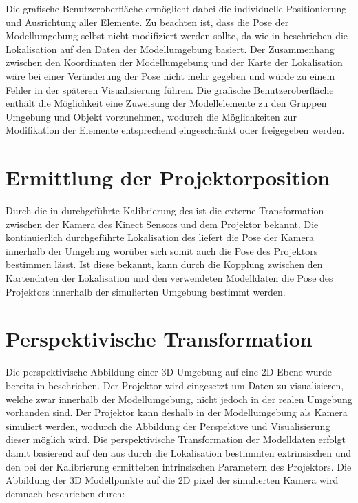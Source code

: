 Die grafische Benutzeroberfläche ermöglicht dabei die individuelle Positionierung und Ausrichtung aller Elemente. Zu beachten ist, dass die Pose der Modellumgebung selbst nicht modifiziert werden sollte, da wie in  beschrieben die Lokalisation auf den Daten der Modellumgebung basiert. Der Zusammenhang zwischen den Koordinaten der Modellumgebung und der Karte der Lokalisation wäre bei einer Veränderung der Pose nicht mehr gegeben und würde zu einem Fehler in der späteren Visualisierung führen. Die grafische Benutzeroberfläche enthält die Möglichkeit eine Zuweisung der Modellelemente zu den Gruppen Umgebung und Objekt vorzunehmen, wodurch die Möglichkeiten zur Modifikation der Elemente entsprechend eingeschränkt oder freigegeben werden.



\section{Ermittlung der Projektorposition}
Durch die in  durchgeführte Kalibrierung des  ist die externe Transformation zwischen der Kamera des Kinect Sensors und dem Projektor bekannt. Die kontinuierlich durchgeführte Lokalisation des  liefert die Pose der Kamera innerhalb der Umgebung worüber sich somit auch die Pose des Projektors bestimmen lässt. Ist diese bekannt, kann durch die Kopplung zwischen den Kartendaten der Lokalisation und den verwendeten Modelldaten die Pose des Projektors innerhalb der simulierten Umgebung bestimmt werden.

\section{Perspektivische Transformation}
Die perspektivische Abbildung einer 3D Umgebung auf eine 2D Ebene wurde bereits in  beschrieben. Der Projektor wird eingesetzt um Daten zu visualisieren, welche zwar innerhalb der Modellumgebung, nicht jedoch in der realen Umgebung vorhanden sind. Der Projektor kann deshalb in der Modellumgebung als Kamera simuliert werden, wodurch die Abbildung der Perspektive und Visualisierung dieser möglich wird. Die perspektivische Transformation der Modelldaten erfolgt damit basierend auf den aus durch die Lokalisation bestimmten extrinsischen und den bei der Kalibrierung ermittelten intrinsischen Parametern des Projektors. Die Abbildung der 3D Modellpunkte auf die 2D pixel der simulierten Kamera wird demnach beschrieben durch:

